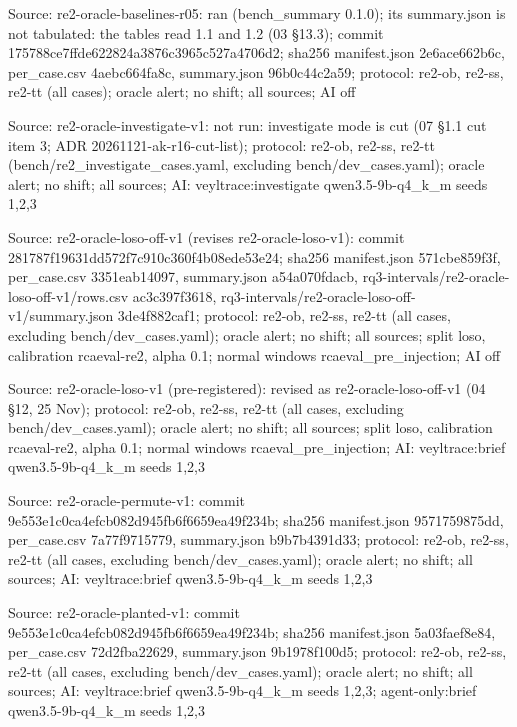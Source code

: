 \noindent Source: re2-oracle-baselines-r05: ran (bench\_summary 0.1.0); its summary.json is not tabulated: the tables read 1.1 and 1.2 (03 \S{}13.3); commit 175788ce7ffde622824a3876c3965c527a4706d2; sha256 manifest.json 2e6ace662b6c, per\_case.csv 4aebc664fa8c, summary.json 96b0c44c2a59; protocol: re2-ob, re2-ss, re2-tt (all cases); oracle alert; no shift; all sources; AI off\par
\noindent Source: re2-oracle-investigate-v1: not run: investigate mode is cut (07 \S{}1.1 cut item 3; ADR 20261121-ak-r16-cut-list); protocol: re2-ob, re2-ss, re2-tt (bench/\allowbreak{}re2\_investigate\_cases.yaml, excluding bench/\allowbreak{}dev\_cases.yaml); oracle alert; no shift; all sources; AI: veyltrace:investigate qwen3.5-9b-q4\_k\_m seeds 1,2,3\par
\noindent Source: re2-oracle-loso-off-v1 (revises re2-oracle-loso-v1): commit 281787f19631dd572f7c910c360f4b08ede53e24; sha256 manifest.json 571cbe859f3f, per\_case.csv 3351eab14097, summary.json a54a070fdacb, rq3-intervals/\allowbreak{}re2-oracle-loso-off-v1/\allowbreak{}rows.csv ac3c397f3618, rq3-intervals/\allowbreak{}re2-oracle-loso-off-v1/\allowbreak{}summary.json 3de4f882caf1; protocol: re2-ob, re2-ss, re2-tt (all cases, excluding bench/\allowbreak{}dev\_cases.yaml); oracle alert; no shift; all sources; split loso, calibration rcaeval-re2, alpha 0.1; normal windows rcaeval\_pre\_injection; AI off\par
\noindent Source: re2-oracle-loso-v1 (pre-registered): revised as re2-oracle-loso-off-v1 (04 \S{}12, 25 Nov); protocol: re2-ob, re2-ss, re2-tt (all cases, excluding bench/\allowbreak{}dev\_cases.yaml); oracle alert; no shift; all sources; split loso, calibration rcaeval-re2, alpha 0.1; normal windows rcaeval\_pre\_injection; AI: veyltrace:brief qwen3.5-9b-q4\_k\_m seeds 1,2,3\par
\noindent Source: re2-oracle-permute-v1: commit 9e553e1c0ca4efcb082d945fb6f6659ea49f234b; sha256 manifest.json 9571759875dd, per\_case.csv 7a77f9715779, summary.json b9b7b4391d33; protocol: re2-ob, re2-ss, re2-tt (all cases, excluding bench/\allowbreak{}dev\_cases.yaml); oracle alert; no shift; all sources; AI: veyltrace:brief qwen3.5-9b-q4\_k\_m seeds 1,2,3\par
\noindent Source: re2-oracle-planted-v1: commit 9e553e1c0ca4efcb082d945fb6f6659ea49f234b; sha256 manifest.json 5a03faef8e84, per\_case.csv 72d2fba22629, summary.json 9b1978f100d5; protocol: re2-ob, re2-ss, re2-tt (all cases, excluding bench/\allowbreak{}dev\_cases.yaml); oracle alert; no shift; all sources; AI: veyltrace:brief qwen3.5-9b-q4\_k\_m seeds 1,2,3; agent-only:brief qwen3.5-9b-q4\_k\_m seeds 1,2,3\par
